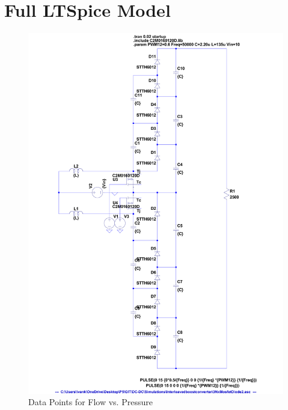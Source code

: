 \chapter{Full LTSpice Model}
\label{app:LTSpice}
\begin{figure}[H]
	\centering
	\includegraphics[height = 0.8\textheight, keepaspectratio]{figures/6Nx_LTSpice.pdf}
	\caption{Data Points for Flow vs. Pressure}
\end{figure}